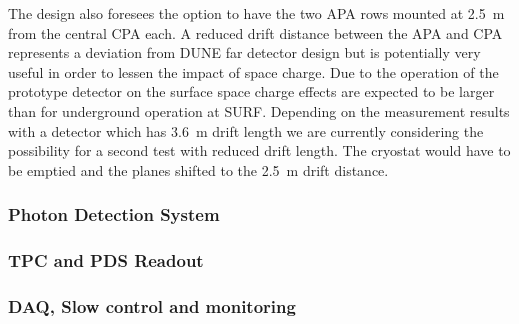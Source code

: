The design also foresees the option to have the two APA rows mounted at 2.5~m from the central CPA each.
A reduced drift distance between the APA and CPA represents a deviation from DUNE far detector design but is potentially very
useful in order to lessen the impact of space charge. Due to the operation of the prototype detector on the surface space charge 
 effects are expected to be larger than for underground operation at SURF.
 Depending on the measurement results with a detector which has 3.6~m drift length 
 we are currently considering the possibility for a second test with reduced drift length.
 The cryostat would have to be emptied and the planes shifted to the 2.5~m drift distance.







\subsubsection{Photon Detection System}


\subsubsection{TPC and PDS Readout}


\subsubsection{DAQ, Slow control and monitoring}





